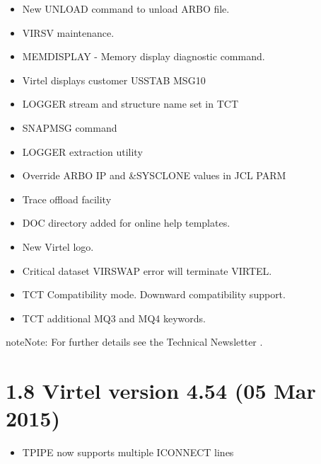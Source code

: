 \documentclass[letterpaper,10pt,english]{sphinxmanual}
\begin{document}
\begin{itemize}
\item {} 
New UNLOAD command to unload ARBO file.

\item {} 
VIRSV maintenance.

\item {} 
MEMDISPLAY - Memory display diagnostic command.

\item {} 
Virtel displays customer USSTAB MSG10

\item {} 
LOGGER stream and structure name set in TCT

\item {} 
SNAPMSG command

\item {} 
LOGGER extraction utility

\item {} 
Override ARBO IP and \&SYSCLONE values in JCL PARM

\item {} 
Trace offload facility

\item {} 
DOC directory added for online help templates.

\item {} 
New Virtel logo.

\item {} 
Critical dataset VIRSWAP error will terminate VIRTEL.

\item {} 
TCT Compatibility mode. Downward compatibility support.

\end{itemize}

\begin{itemize}
\item {} 
TCT additional MQ3 and MQ4 keywords.

\end{itemize}

\begin{sphinxadmonition}{note}{Note:}
For further details see the Technical Newsletter .
\end{sphinxadmonition}


\section{1.8 Virtel version 4.54 (05 Mar 2015)}
\label{\detokenize{Installation_Guide:virtel-version-4-54-05-mar-2015}}
\begin{itemize}
\item {} 
TPIPE now supports multiple ICONNECT lines

\end{itemize}
\end{document}
